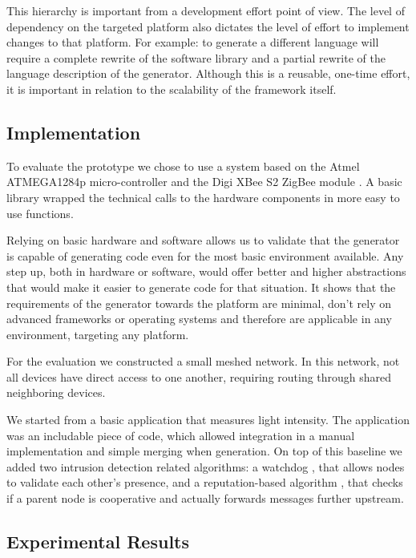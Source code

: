 \documentclass[conference]{IEEEtran}
\begin{document}
This hierarchy is important from a development effort point of view. The level
of dependency on the targeted platform also dictates the level of effort to
implement changes to that platform. For example: to generate a different
language will require a complete rewrite of the software library and a partial
rewrite of the language description of the generator. Although this is a
reusable, one-time effort, it is important in relation to the scalability of
the framework itself.

\subsection{Implementation}

To evaluate the prototype we chose to use a system based on the Atmel
ATMEGA1284p micro-controller \cite{datasheet:atmega1284p} and the Digi XBee S2
ZigBee module \cite{manual:xbee}. A basic library wrapped the technical calls
to the hardware components in more easy to use functions.

Relying on basic hardware and software allows us to validate that the generator
is capable of generating code even for the most basic environment available.
Any step up, both in hardware or software, would offer better and higher
abstractions that would make it easier to generate code for that situation. It
shows that the requirements of the generator towards the platform are minimal,
don't rely on advanced frameworks or operating systems and therefore are
applicable in any environment, targeting any platform.

For the evaluation we constructed a small meshed network. In this network, not
all devices have direct access to one another, requiring routing through shared
neighboring devices.

We started from a basic application that measures light intensity. The
application was an includable piece of code, which allowed integration in a
manual implementation and simple merging when generation. On top of this
baseline we added two intrusion detection related algorithms: a
watchdog \cite{mishra2004intrusion}, that allows nodes to validate each other's
presence, and a reputation-based algorithm \cite{ganeriwal2008reputation}, that
checks if a parent node is cooperative and actually forwards messages further
upstream.

\subsection{Experimental Results}
\end{document}
